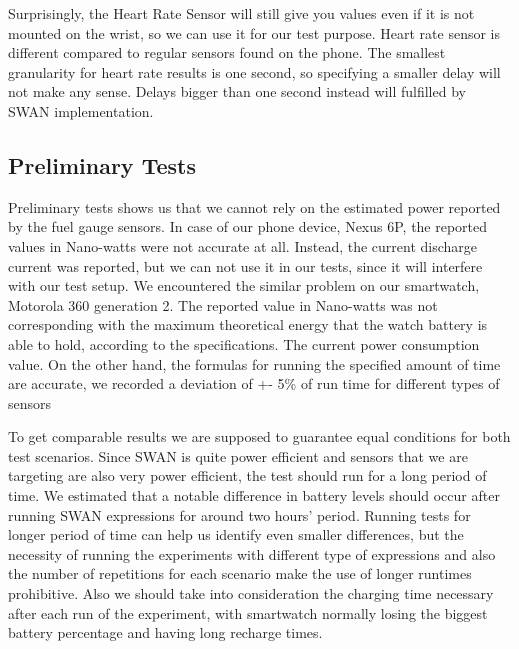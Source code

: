 Surprisingly, the Heart Rate Sensor will still give you values even if it is not mounted on the wrist, so we can use it for our test purpose. 
Heart rate sensor is different compared to regular sensors found on the phone. The smallest granularity for heart rate results is one second,
so specifying a smaller delay will not make any sense.  Delays bigger than one second instead will fulfilled by SWAN implementation.
 
 \subsection{Preliminary Tests}
Preliminary tests shows us that we cannot rely on the estimated power reported by the fuel gauge sensors. In case of our phone device,
Nexus 6P, the reported values in Nano-watts were not accurate at all. Instead, the current discharge current was reported, 
but we can not use it in our tests, since it will interfere with our test setup.
We encountered the similar problem on our smartwatch, Motorola 360 generation 2. 
The reported value in Nano-watts was not corresponding with the maximum theoretical energy that the watch battery is able to hold, according to the specifications.
The current power consumption value.
On the other hand, the formulas for running the specified amount of time are accurate, we recorded a deviation of +- 5\% of run time for different types of sensors 

To get comparable results we are supposed to guarantee equal conditions for both test scenarios.
Since SWAN is quite power efficient and sensors that we are targeting are also very power efficient, the test should run for a long period of time.
We estimated that a notable difference in battery levels should occur after running SWAN expressions for around two hours' period.
Running tests for longer period of time can help us identify even smaller differences, 
but the necessity of running the experiments with different type of expressions and also the number of repetitions for each scenario make the use of longer runtimes prohibitive.
Also we should take into consideration the charging time necessary after each run of the experiment,
with smartwatch normally losing the biggest battery percentage  and having long recharge times.

